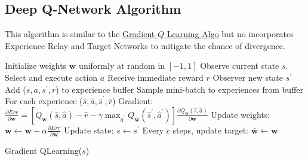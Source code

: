 \documentclass[12pt]{article}
\begin{document}
        \subsection{Deep Q-Network Algorithm}
            This algorithm is similar to the \hyperref[GradientQLearningAlgo]{Gradient $Q$ Learning Algo} but no
            incorporates Experience Relay and Target Networks to mitigate the chance of divergence. 
            
            \begin{algorithm}[H] \label{DeepQLearning}
                \SetAlgoLined
                Initialize weights $\boldsymbol{w}$ uniformly at random in $[-1,1]$
                Observe current state $s$.
                 {
                    Select and execute action $a$ \;
                    Receive immediate reward $r$ \;
                    Observer new state $s^{\prime}$ \;
                    Add ($s, a, s^{\prime}, r$) to experience buffer \;
                    Sample mini-batch to experiences from buffer \;
                    For each experience ($\hat{s}, \hat{a}, \hat{s}^{\prime}, \hat{r}$) \;
                        \Indp
                        Gradient: $\frac{\partial Err}{\partial \boldsymbol{w}}=\left[Q_{\boldsymbol{w}}(\hat{s}, \hat{a})-\hat{r}-\gamma \max _{\hat{a}^{\prime}}
                        Q_{\bar{\boldsymbol{w}}}\left(\hat{s}^{\prime}, \hat{a}^{\prime}\right)\right] \frac{\partial Q_{\boldsymbol{w}}(\hat{s},
                        \hat{a})}{\partial \boldsymbol{w}}$ \;
                        Update weights: $\boldsymbol{w} \gets \boldsymbol{w} - \alpha \frac{\partial Err}{\partial
                        \boldsymbol{w}}$ \;
                        \Indm
                    Update state: $ s \gets s^{\prime} $
                    Every $c$ steps, update target: $\bar{\boldsymbol{w}} \gets \boldsymbol{w}$
                }
                \caption{Gradient QLearning($s$)}
            \end{algorithm}
            

\printindex
\end{document}
